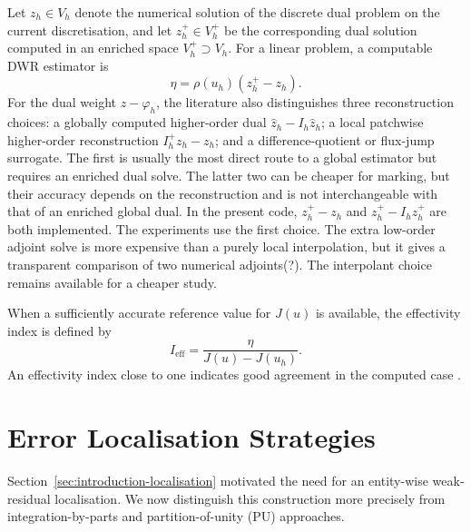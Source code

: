 Let \(z_h\in V_h\) denote the numerical solution of the discrete dual problem on the current discretisation, and let \(z_h^+\in V_h^+\) be the corresponding dual solution computed in an enriched space \(V_h^+\supset V_h\). For a linear problem, a computable DWR estimator is
\begin{equation}
  \eta
  =
  \rho(u_h)(z_h^+-z_h).
  \label{eq:computable-dwr-two-solves}
\end{equation}
For the dual weight \(z-\varphi_h\), the literature \cite{ENDTMAYER202419} also distinguishes three reconstruction choices: a globally computed higher-order dual \(\widehat z_h-I_h\widehat z_h\); a local patchwise higher-order reconstruction \(I_h^+z_h-z_h\); and a difference-quotient or flux-jump surrogate. The first is usually the most direct route to a global estimator but requires an enriched dual solve. The latter two can be cheaper for marking, but their accuracy depends on the reconstruction and is not interchangeable with that of an enriched global dual. In the present code, \(z_h^+-z_h\) and \(z_h^+-I_hz_h^+\) are both implemented. The experiments use the first choice. The extra low-order adjoint solve is more expensive than a purely local interpolation, but it gives a transparent comparison of two numerical adjoints(?). The interpolant choice remains available for a cheaper study.

When a sufficiently accurate reference value for \(J(u)\) is available, the effectivity index is defined by
\begin{equation}
  I_{\mathrm{eff}}
  =
  \frac{\eta}{J(u)-J(u_h)}.
  \label{eq:signed-effectivity}
\end{equation}
An effectivity index close to one indicates good agreement in the computed case \cite{Bangerth_Rannacher_2003}.



\section{Error Localisation Strategies}
\label{sec:background-localisation}

Section~\ref{sec:introduction-localisation} motivated the need for an entity-wise weak-residual localisation. We now distinguish this construction more precisely from integration-by-parts and partition-of-unity (PU) approaches.

